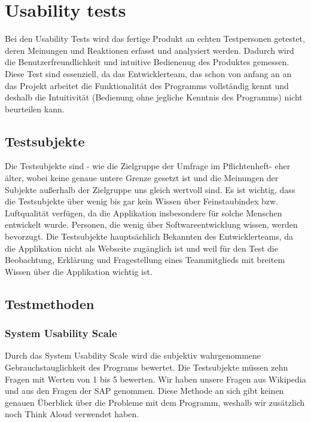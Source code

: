 \section{Usability tests}

Bei den Usability Tests wird das fertige Produkt an echten Testpersonen getestet, deren  Meinungen und Reaktionen erfasst und analysiert werden. Dadurch wird die Benutzerfreundlichkeit und intuitive Bedienenug des Produktes gemessen. Diese Test sind essenziell, da das Entwicklerteam, das schon von anfang an an das Projekt arbeitet die Funktionalität des Programms vollständig kennt und deshalb die Intuitivität (Bedienung ohne jegliche Kenntnis des Programms) nicht beurteilen kann.

\subsection{Testsubjekte}

Die Testsubjekte sind - wie die Zielgruppe der Umfrage im Pflichtenheft- eher älter, wobei keine genaue untere Grenze gesetzt ist und die Meinungen der Subjekte außerhalb der Zielgruppe uns gleich wertvoll sind. Es ist wichtig, dass die Testsubjekte über wenig bis gar kein Wissen über Feinstaubindex bzw. Luftqualität verfügen, da die Applikation insbesondere für solche Menschen entwickelt wurde. Personen, die wenig über Softwareentwicklung wissen, werden bevorzugt. Die Testsubjekte hauptsächlich Bekannten des Entwicklerteams, da die Applikation nicht als Webseite zugänglich ist und weil für den Test die Beobachtung, Erklärung und Fragestellung eines Teammitglieds mit breitem Wissen über die Applikation wichtig ist.

\subsection{Testmethoden} 
\subsubsection{System Usability Scale}

Durch das System Usability Scale wird die subjektiv wahrgenommene Gebrauchstauglichkeit des Programs bewertet. Die Testsubjekte müssen zehn Fragen mit Werten von 1 bis 5 bewerten. Wir haben unsere Fragen aus Wikipedia und aus den Fragen der SAP genommen. Diese Methode an sich gibt keinen genauen Überblick über die Probleme mit dem Programm, weshalb wir zusätzlich noch Think Aloud verwendet haben.


